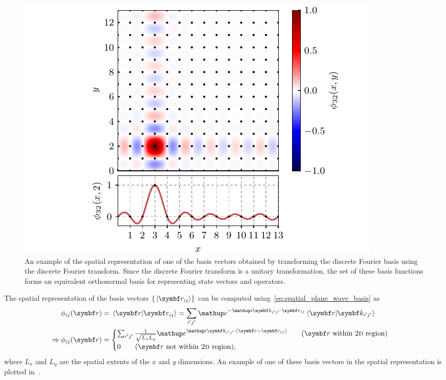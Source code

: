 \begin{figure}[t]
    \centerfloat
    \includegraphics[width=\textwidth]{figures/numerics/basis_vecs.pdf}
    \caption{An example of the spatial representation of one of the basis vectors obtained by transforming the discrete Fourier basis using the discrete Fourier transform. Since the discrete Fourier transform is a unitary transformation, the set of these basis functions forms an equivalent orthonormal basis for representing state vectors and operators.}

    \label{fig:basis_vecs}
\end{figure}

The spatial representation of the basis vectors $\{\ket{\vec r_{ij}}\}$ can be computed using~\eqref{eq:spatial_plane_wave_basis} as
\begin{align}
\phi_{ij}(\vec r) &= \braket{\vec r}{\vec r_{i j}} = \sum_{i^\prime j^\prime} \ee^{-\ii \vec k_{i^\prime j^\prime} \cdot \vec r_{i j}}\braket{\vec r}{\vec k_{i^\prime j^\prime}}\\
\Rightarrow \phi_{ij}(\vec r) &=\begin{cases}
\sum_{i^\prime j^\prime} \frac 1 {\sqrt {L_x L_y}} \ee^{\ii \vec k_{i^\prime j^\prime} \cdot (\vec r - \vec r_{i j})}\qquad (\vec r\ \textrm{within \textsc{2d} region})\\
0\qquad(\vec r\ \textrm{not within \textsc{2d} region}),
\end{cases}
\end{align}
where $L_x$ and $L_y$ are the spatial extents of the $x$ and $y$ dimensions. An example of one of these basis vectors in the spatial representation is plotted in~.

